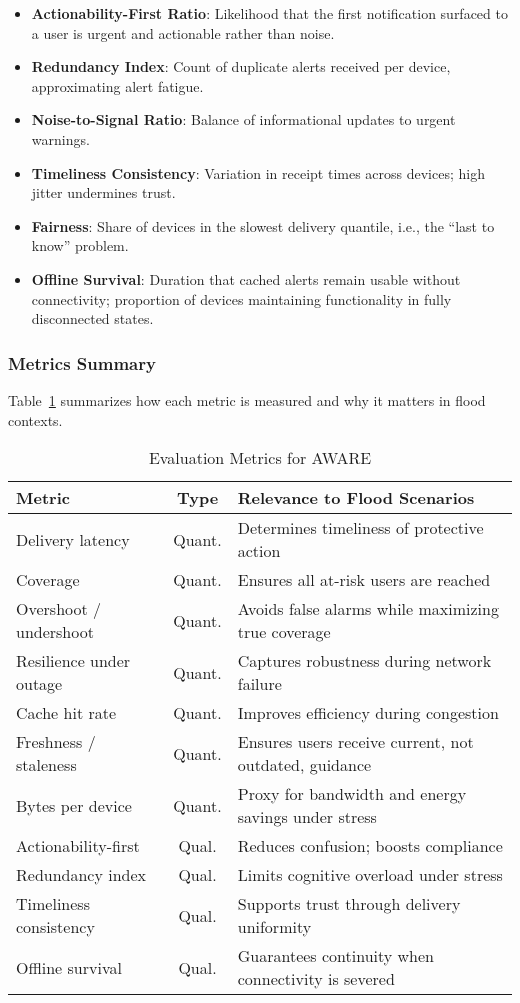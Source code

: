 \documentclass[11pt,twocolumn]{article}
\begin{document}
\begin{itemize}
    \item \textbf{Actionability-First Ratio}: Likelihood that the first notification surfaced to a user is urgent and actionable rather than noise.
    \item \textbf{Redundancy Index}: Count of duplicate alerts received per device, approximating alert fatigue.
    \item \textbf{Noise-to-Signal Ratio}: Balance of informational updates to urgent warnings.
    \item \textbf{Timeliness Consistency}: Variation in receipt times across devices; high jitter undermines trust.
    \item \textbf{Fairness}: Share of devices in the slowest delivery quantile, i.e., the ``last to know'' problem.
    \item \textbf{Offline Survival}: Duration that cached alerts remain usable without connectivity; proportion of devices maintaining functionality in fully disconnected states.
\end{itemize}

\subsubsection{Metrics Summary}
Table~\ref{tab:metrics} summarizes how each metric is measured and why it matters in flood contexts.

\begin{table}[ht]
\centering
\caption{Evaluation Metrics for AWARE}
\label{tab:metrics}
\begin{tabularx}{\linewidth}{@{}l c X@{}}
\toprule
\textbf{Metric} & \textbf{Type} & \textbf{Relevance to Flood Scenarios} \\ \midrule
Delivery latency & Quant. & Determines timeliness of protective action \\
Coverage & Quant. & Ensures all at-risk users are reached \\
Overshoot / undershoot & Quant. & Avoids false alarms while maximizing true coverage \\
Resilience under outage & Quant. & Captures robustness during network failure \\
Cache hit rate & Quant. & Improves efficiency during congestion \\
Freshness / staleness & Quant. & Ensures users receive current, not outdated, guidance \\
Bytes per device & Quant. & Proxy for bandwidth and energy savings under stress \\
Actionability-first & Qual. & Reduces confusion; boosts compliance \\
Redundancy index & Qual. & Limits cognitive overload under stress \\
Timeliness consistency & Qual. & Supports trust through delivery uniformity \\
Offline survival & Qual. & Guarantees continuity when connectivity is severed \\ 
\bottomrule
\end{tabularx}
\end{table}
\end{document}
